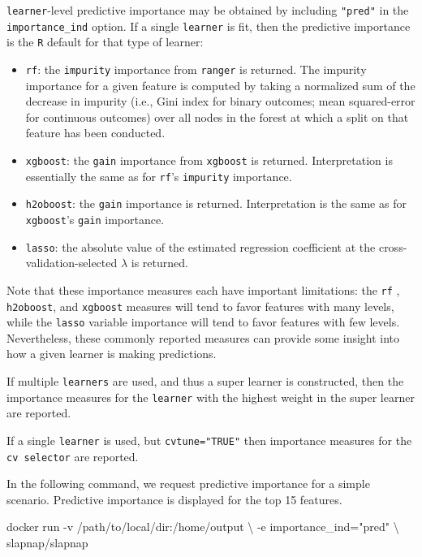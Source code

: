\documentclass[]{article}
\newenvironment{Shaded}{\begin{snugshade}}{\end{snugshade}}
\newcommand{\StringTok}[1]{\textcolor[rgb]{0.31,0.60,0.02}{#1}}
\newcommand{\ExtensionTok}[1]{#1}
\newcommand{\NormalTok}[1]{#1}
\providecommand{\tightlist}{%
  \setlength{\itemsep}{0pt}\setlength{\parskip}{0pt}}
\begin{document}
\texttt{learner}-level predictive importance may be obtained by
including \texttt{"pred"} in the \texttt{importance\_ind} option. If a
single \texttt{learner} is fit, then the predictive importance is the
\texttt{R} default for that type of learner:

\begin{itemize}
\tightlist
\item
  \texttt{rf}: the \texttt{impurity} importance from \texttt{ranger}
  \citep{rangerpkg} is returned. The impurity importance for a given
  feature is computed by taking a normalized sum of the decrease in
  impurity (i.e., Gini index for binary outcomes; mean squared-error for
  continuous outcomes) over all nodes in the forest at which a split on
  that feature has been conducted.
\item
  \texttt{xgboost}: the \texttt{gain} importance from \texttt{xgboost}
  \citep{xgboostpkg} is returned. Interpretation is essentially the same
  as for \texttt{rf}'s \texttt{impurity} importance.
\item
  \texttt{h2oboost}: the \texttt{gain} importance \citep{h2opkg} is
  returned. Interpretation is the same as for \texttt{xgboost}'s
  \texttt{gain} importance.
\item
  \texttt{lasso}: the absolute value of the estimated regression
  coefficient at the cross-validation-selected \(\lambda\) is returned.
\end{itemize}

Note that these importance measures each have important limitations: the
\texttt{rf} , \texttt{h2oboost}, and \texttt{xgboost} measures will tend
to favor features with many levels, while the \texttt{lasso} variable
importance will tend to favor features with few levels. Nevertheless,
these commonly reported measures can provide some insight into how a
given learner is making predictions.

If multiple \texttt{learners} are used, and thus a super learner is
constructed, then the importance measures for the \texttt{learner} with
the highest weight in the super learner are reported.

If a single \texttt{learner} is used, but \texttt{cvtune="TRUE"} then
importance measures for the \texttt{cv\ selector} are reported.

In the following command, we request predictive importance for a simple
scenario. Predictive importance is displayed for the top 15 features.

\begin{Shaded}
\begin{Highlighting}[]
\ExtensionTok{docker}\NormalTok{ run -v /path/to/local/dir:/home/output \textbackslash{}}
\NormalTok{           -e importance_ind=}\StringTok{"pred"}\NormalTok{ \textbackslash{}}
\NormalTok{           slapnap/slapnap}
\end{Highlighting}
\end{Shaded}
\end{document}
